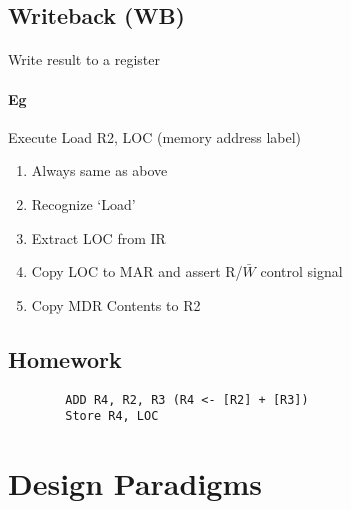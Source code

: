 \documentclass[12pt]{report}
\begin{document}
    \subsection{Writeback (WB)}
      \paragraph{} Write result to a register
      \paragraph{Eg} Execute Load R2, LOC (memory address label)
      \begin{enumerate}
        \item Always same as above
        \item Recognize `Load'
        \item Extract LOC from IR
        \item Copy LOC to MAR and assert R/$\bar{W}$ control signal
        \item Copy MDR Contents to R2
      \end{enumerate}

    \subsection{Homework}
      \begin{lstlisting}
        ADD R4, R2, R3 (R4 <- [R2] + [R3])
        Store R4, LOC
      \end{lstlisting}

  \section{Design Paradigms}
\end{document}
